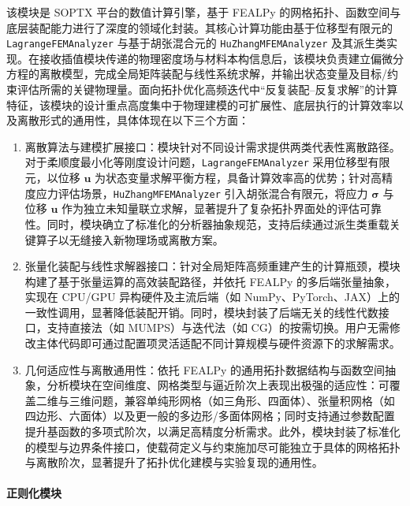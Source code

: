 该模块是 SOPTX 平台的数值计算引擎，基于 FEALPy 的网格拓扑、函数空间与底层装配能力进行了深度的领域化封装。其核心计算功能由基于位移型有限元的 \texttt{LagrangeFEMAnalyzer} 与基于胡张混合元的 \texttt{HuZhangMFEMAnalyzer} 及其派生类实现。在接收插值模块传递的物理密度场与材料本构信息后，该模块负责建立偏微分方程的离散模型，完成全局矩阵装配与线性系统求解，并输出状态变量及目标/约束评估所需的关键物理量。面向拓扑优化高频迭代中“反复装配{--}反复求解”的计算特征，该模块的设计重点高度集中于物理建模的可扩展性、底层执行的计算效率以及离散形式的通用性，具体体现在以下三个方面：
\begin{enumerate}[
	label={（\arabic*）},
	labelsep=0.25em,
	leftmargin=3.2em,
	itemsep=0.4em,
	topsep=0.4em,
	parsep=0pt,
	partopsep=0pt
	]
	\item 离散算法与建模扩展接口：模块针对不同设计需求提供两类代表性离散路径。对于柔顺度最小化等刚度设计问题，\texttt{LagrangeFEMAnalyzer} 采用位移型有限元，以位移 $\boldsymbol{u}$ 为状态变量求解平衡方程，具备计算效率高的优势；针对高精度应力评估场景，\texttt{HuZhangMFEMAnalyzer} 引入胡张混合有限元，将应力 $\boldsymbol{\sigma}$ 与位移 $\boldsymbol{u}$ 作为独立未知量联立求解，显著提升了复杂拓扑界面处的评估可靠性。同时，模块确立了标准化的分析器抽象规范，支持后续通过派生类重载关键算子以无缝接入新物理场或离散方案。
	
	\item 张量化装配与线性求解器接口：针对全局矩阵高频重建产生的计算瓶颈，模块构建了基于张量运算的高效装配路径，并依托 FEALPy 的多后端张量抽象，实现在 CPU/GPU 异构硬件及主流后端（如 NumPy、PyTorch、JAX）上的一致性调用，显著降低装配开销。同时，模块封装了后端无关的线性代数接口，支持直接法（如 MUMPS）与迭代法（如 CG）的按需切换。用户无需修改主体代码即可通过配置项灵活适配不同计算规模与硬件资源下的求解需求。
	
	\item 几何适应性与离散通用性：依托 FEALPy 的通用拓扑数据结构与函数空间抽象，分析模块在空间维度、网格类型与逼近阶次上表现出极强的适应性：可覆盖二维与三维问题，兼容单纯形网格（如三角形、四面体）、张量积网格（如四边形、六面体）以及更一般的多边形/多面体网格；同时支持通过参数配置提升基函数的多项式阶次，以满足高精度分析需求。此外，模块封装了标准化的模型与边界条件接口，使载荷定义与约束施加尽可能独立于具体的网格拓扑与离散阶次，显著提升了拓扑优化建模与实验复现的通用性。
\end{enumerate}

\paragraph*{正则化模块}

